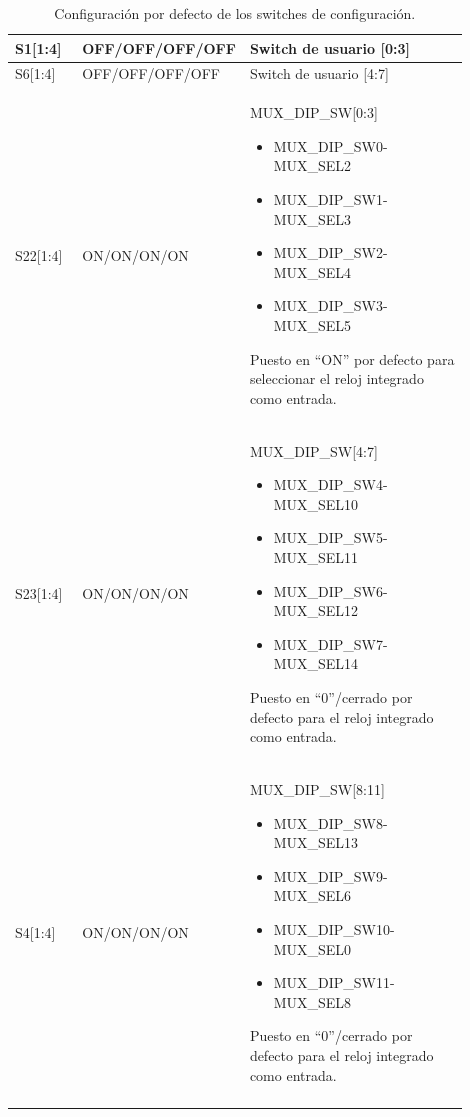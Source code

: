 \begin{longtable}{p{0.15\linewidth}|p{0.25\linewidth}|p{0.5\linewidth}}
             S1[1:4]&OFF/OFF/OFF/OFF&Switch de usuario [0:3]\\\midrule
             S6[1:4]&OFF/OFF/OFF/OFF&\parbox[t]{\linewidth}{Switch de usuario [4:7]}\\\midrule
             
             S22[1:4]&ON/ON/ON/ON&\parbox[t]{\linewidth}{MUX\_DIP\_SW[0:3]
             \begin{itemize}
             \item MUX\_DIP\_SW0-MUX\_SEL2
\item MUX\_DIP\_SW1-MUX\_SEL3
\item MUX\_DIP\_SW2-MUX\_SEL4
\item MUX\_DIP\_SW3-MUX\_SEL5
             \end{itemize}}
             Puesto en ``ON'' por defecto para seleccionar el reloj integrado como entrada.
             \\\midrule
             
             S23[1:4]&ON/ON/ON/ON&
             \parbox[t]{\linewidth}{MUX\_DIP\_SW[4:7]
             \begin{itemize}
             \item MUX\_DIP\_SW4-MUX\_SEL10
\item MUX\_DIP\_SW5-MUX\_SEL11
\item MUX\_DIP\_SW6-MUX\_SEL12
\item MUX\_DIP\_SW7-MUX\_SEL14
             \end{itemize}}
             Puesto en ``0''/cerrado por defecto para el reloj integrado como entrada.
             \\\midrule
             S4[1:4]&ON/ON/ON/ON&
             \parbox[t]{\linewidth}{MUX\_DIP\_SW[8:11]
             \begin{itemize}
             \item MUX\_DIP\_SW8-MUX\_SEL13
\item MUX\_DIP\_SW9-MUX\_SEL6
\item MUX\_DIP\_SW10-MUX\_SEL0
\item MUX\_DIP\_SW11-MUX\_SEL8
             \end{itemize}}
             Puesto en ``0''/cerrado por defecto para el reloj integrado como entrada.
             \\\bottomrule

             \caption{Configuraci\'on por defecto de los switches de configuraci\'on.}
        \label{tablasw}
        \end{longtable}
        

